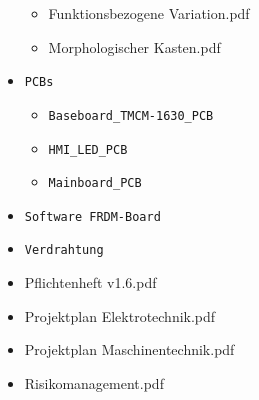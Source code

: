 \begin{appendix}
\begin{itemize}
\begin{itemize}
		\item Funktionsbezogene Variation.pdf
		\item Morphologischer Kasten.pdf
	\end{itemize}
	\item \verb|PCBs|
	\begin{itemize}
	\item \verb|Baseboard_TMCM-1630_PCB|
	\item \verb|HMI_LED_PCB|
	\item \verb|Mainboard_PCB|
	\end{itemize}
	\item \verb|Software FRDM-Board|
	\item \verb|Verdrahtung|
	\item Pflichtenheft v1.6.pdf
	\item Projektplan Elektrotechnik.pdf
	\item Projektplan Maschinentechnik.pdf
	\item Risikomanagement.pdf
\end{itemize}

%
%
%
%
%

\end{appendix}